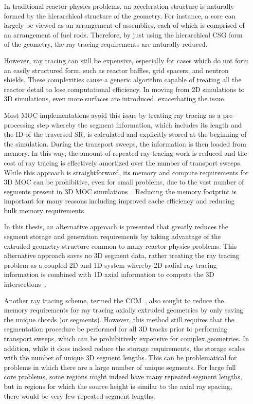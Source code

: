 In traditional reactor physics problems, an acceleration structure is naturally formed by the hierarchical structure of the geometry. For instance, a core can largely be viewed as an arrangement of assemblies, each of which is comprised of an arrangement of fuel rods. Therefore, by just using the hierarchical \ac{CSG} form of the geometry, the ray tracing requirements are naturally reduced.

However, ray tracing can still be expensive, especially for cases which do not form an easily structured form, such as reactor baffles, grid spacers, and neutron shields. These complexities cause a generic algorithm capable of treating all the reactor detail to lose computational efficiency. In moving from 2D simulations to 3D simulations, even more surfaces are introduced, exacerbating the issue.
	
Most \ac{MOC} implementations avoid this issue by treating ray tracing as a pre-processing step whereby the segment information, which includes its length and the ID of the traversed \ac{SR}, is calculated and explicitly stored at the beginning of the simulation. During the transport sweeps, the information is then loaded from memory. In this way, the amount of repeated ray tracing work is reduced and the cost of ray tracing is effectively amortized over the number of transport sweeps. While this approach is straightforward, its memory and compute requirements for 3D \ac{MOC} can be prohibitive, even for small problems, due to the vast number of segments present in 3D \ac{MOC} simulations~\cite{physor2016otf}. Reducing the memory footprint is important for many reasons including improved cache efficiency and reducing bulk memory requirements.

In this thesis, an alternative approach is presented that greatly reduces the segment storage and generation requirements by taking advantage of the extruded geometry structure common to many reactor physics problems. This alternative approach saves no 3D segment data, rather treating the ray tracing problem as a coupled 2D and 1D system whereby 2D radial ray tracing information is combined with 1D axial information to compute the 3D intersections~\cite{physor2016otf}.

Another ray tracing scheme, termed the \ac{CCM}~\cite{Sciannandrone2016}, also sought to reduce the memory requirements for ray tracing axially extruded geometries by only saving the unique chords (or segments).  However, this method still requires that the segmentation procedure be performed for all 3D tracks prior to performing transport sweeps, which can be prohibitively expensive for complex geometries. In addition, while it does indeed reduce the storage requirements, the storage scales with the number of unique 3D segment lengths. This can be problematical for problems in which there are a large number of unique segments. For large full core problems, some regions might indeed have many repeated segment lengths, but in regions for which the source height is similar to the axial ray spacing, there would be very few repeated segment lengths.

